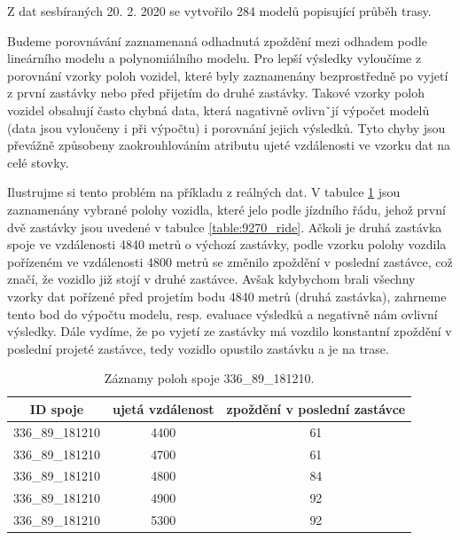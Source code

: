 \bigbreak

Z dat sesbíraných 20. 2. 2020 se vytvořilo 284 modelů popisující průběh trasy.

\bigbreak

Budeme porovnávání zaznamenaná odhadnutá zpoždění mezi odhadem podle lineárního modelu a polynomiálního modelu. Pro lepší výsledky vyloučíme z porovnání vzorky poloh vozidel, které byly zaznamenány bezprostředně po vyjetí z první zastávky nebo před přijetím do druhé zastávky. Takové vzorky poloh vozidel obsahují často chybná data, která nagativně ovlivnˇjí výpočet modelů (data jsou vyloučeny i při výpočtu) i porovnání jejich výsledků. Tyto chyby jsou převážně způsobeny zaokrouhlováním atributu ujeté vzdálenosti ve vzorku dat na celé stovky.

\bigbreak

Ilustrujme si tento problém na příkladu z reálných dat. V tabulce \ref{table:9270_samples} jsou zaznamenány vybrané polohy vozidla, které jelo podle jízdního řádu, jehož první dvě zastávky jsou uvedené v tabulce \ref{table:9270_ride}. Ačkoli je druhá zastávka spoje ve vzdálenosti 4840 metrů o výchozí zastávky, podle vzorku polohy vozdila pořízeném ve vzdálenosti 4800 metrů se změnilo zpoždění v poslední zastávce, což značí, že vozidlo již stojí v druhé zastávce. Avšak kdybychom brali všechny vzorky dat pořízené před projetím bodu 4840 metrů (druhá zastávka), zahrneme tento bod do výpočtu modelu, resp. evaluace výsledků a negativně nám ovlivní výsledky. Dále vydíme, že po vyjetí ze zastávky má vozdilo konstantní zpoždění v poslední projeté zastávce, tedy vozidlo opustilo zastávku a je na trase.

\begin{center}
	\begin{table}[ht]
\centering
\begin{tabular}{|c|c|c|}
\hline
ID spoje & ujetá vzdálenost & zpoždění v poslední zastávce \\ \hline \hline
336\_89\_181210 & 4400 & 61 \\ \hline
336\_89\_181210 & 4700 & 61 \\ \hline
336\_89\_181210 & 4800 & 84 \\ \hline
336\_89\_181210 & 4900 & 92 \\ \hline
336\_89\_181210 & 5300 & 92 \\ \hline
\end{tabular}
\label{table:9270_samples}
\caption{Záznamy poloh spoje 336\_89\_181210.}
\end{table}
\end{center}

